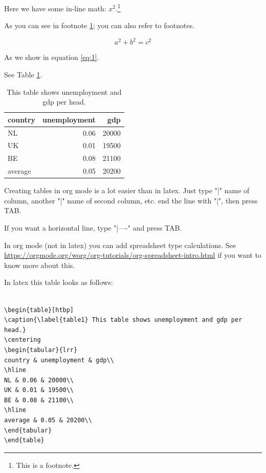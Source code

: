 \documentclass[11pt]{article}
\begin{document}
Here we have some in-line math: \(x^2\).\footnote{\label{fn:footnote} This is a footnote.}

As you can see in footnote \ref{fn:footnote}; you can also refer to footnotes.


\begin{equation}
\label{eq:1}
a^2 + b^2 = c^2
\end{equation}

As we show in equation \eqref{eq:1}.

See Table \ref{table1}.

\begin{table}[htbp]
\caption{\label{table1} This table shows unemployment and gdp per head.}
\centering
\begin{tabular}{lrr}
country & unemployment & gdp\\
\hline
NL & 0.06 & 20000\\
UK & 0.01 & 19500\\
BE & 0.08 & 21100\\
\hline
average & 0.05 & 20200\\
\end{tabular}
\end{table}

Creating tables in org mode is a lot easier than in latex. Just type "|" name of column, another "|" name of second column, etc. end the line with "|", then press TAB.

If you want a horizontal line, type "|----" and press TAB.

In org mode (not in latex) you can add spreadsheet type calculations. See \url{https://orgmode.org/worg/org-tutorials/org-spreadsheet-intro.html} if you want to know more about this.

In latex this table looks as follows:

\begin{verbatim}

\begin{table}[htbp]
\caption{\label{table1} This table shows unemployment and gdp per head.}
\centering
\begin{tabular}{lrr}
country & unemployment & gdp\\
\hline
NL & 0.06 & 20000\\
UK & 0.01 & 19500\\
BE & 0.08 & 21100\\
\hline
average & 0.05 & 20200\\
\end{tabular}
\end{table}

\end{verbatim}
\end{document}
